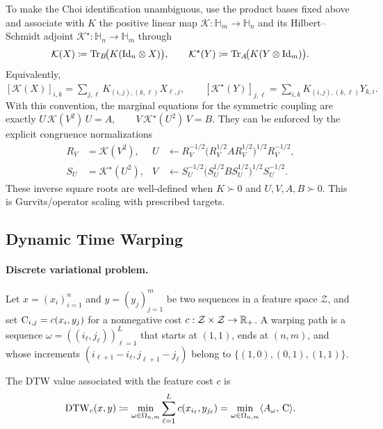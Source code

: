 To make the Choi identification unambiguous, use the product bases fixed above and associate with $K$ the positive linear map $\mathcal K:\mathbb H_m\to\mathbb H_n$ and its Hilbert--Schmidt adjoint $\mathcal K^\star:\mathbb H_n\to\mathbb H_m$ through
\begin{equation}\label{eq-qot-choi-map}
\mathcal K(X)
\coloneqq
\operatorname{Tr}_B\!\bigl(K(\mathrm{Id}_n\otimes X)\bigr),
\qquad
\mathcal K^\star(Y)
\coloneqq
\operatorname{Tr}_A\!\bigl(K(Y\otimes\mathrm{Id}_m)\bigr).
\end{equation}
Equivalently, \([\mathcal K(X)]_{i,k} = \sum_{j,\ell}K_{(i,j),(k,\ell)}X_{\ell,j}, \qquad [\mathcal K^\star(Y)]_{j,\ell} = \sum_{i,k}K_{(i,j),(k,\ell)}Y_{k,i}.\)
With this convention, the marginal equations for the symmetric coupling are exactly
\(U\,\mathcal K(V^2)\,U=A, \qquad V\,\mathcal K^\star(U^2)\,V=B.\)
They can be enforced by the explicit congruence normalizations
\begin{equation}\label{eq-qot-gurvits-updates}
\begin{aligned}
R_V&=\mathcal K(V^2),
&
U&\leftarrow
R_V^{-1/2}\bigl(R_V^{1/2} A R_V^{1/2}\bigr)^{1/2}R_V^{-1/2},
\\
S_U&=\mathcal K^\star(U^2),
&
V&\leftarrow
S_U^{-1/2}\bigl(S_U^{1/2} B S_U^{1/2}\bigr)^{1/2}S_U^{-1/2}.
\end{aligned}
\end{equation}
These inverse square roots are well-defined when $K\succ0$ and $U,V,A,B\succ0$. This is Gurvits/operator scaling with prescribed targets.

\subsection{Dynamic Time Warping}\label{sec-dynamic-time-warping}
\paragraph{Discrete variational problem.}
Let $x=(x_i)_{i=1}^n$ and $y=(y_j)_{j=1}^m$ be two sequences in a feature space $\mathcal Z$, and set $\mathrm{C}_{i,j}=c(x_i,y_j)$ for a nonnegative cost $c:\mathcal Z\times\mathcal Z\to\mathbb{R}_+$. A warping path is a sequence $\omega=((i_\ell,j_\ell))_{\ell=1}^L$ that starts at $(1,1)$, ends at $(n,m)$, and whose increments $(i_{\ell+1}-i_\ell,j_{\ell+1}-j_\ell)$ belong to $\{(1,0),(0,1),(1,1)\}$.

\begin{defn}\label{def-dynamic-time-warping}
The DTW value associated with the feature cost $c$ is
\begin{equation}\label{eq-dtw-variational}
\mathrm{DTW}_c(x,y)
\coloneqq
\min_{\omega\in\Omega_{n,m}}
\sum_{\ell=1}^L c(x_{i_\ell},y_{j_\ell})
=
\min_{\omega\in\Omega_{n,m}}\langle A_\omega,\,\mathrm{C}\rangle.
\end{equation}
\end{defn}
